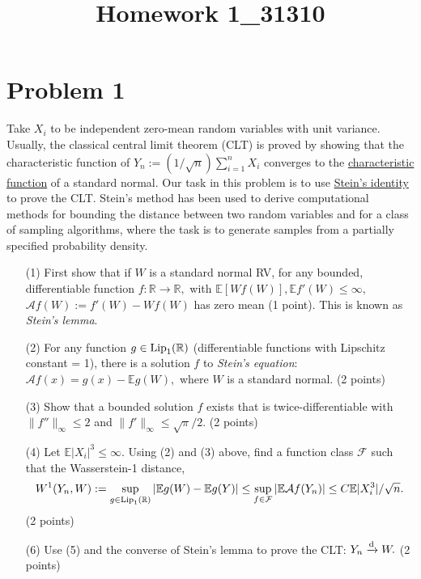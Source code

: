\documentclass[12pt]{article}
\title{Homework 1_31310}
\renewcommand{\E}{\mathbb{E}}
\begin{document}
\MakeScribeTop

\section*{Problem 1}
Take $X_i$ to be independent zero-mean random variables with unit variance.
Usually, the classical central limit theorem (CLT) is proved by showing that the characteristic 
function of $Y_n := (1/\sqrt{n}) \sum_{i=1}^n X_i$ converges to the \href{}{characteristic function} of a 
standard normal. 
Our task in this problem is to use \href{}{Stein's identity} to prove the CLT. Stein's method has been used 
to derive computational methods for bounding the distance between two random variables and for a class 
of sampling algorithms, where the task is to generate samples from a partially specified probability density.
\begin{itemize}
	\item[(1)] First show that if $W$ is a standard normal RV, for any bounded, differentiable function $f:\mathbb{R} \to \mathbb{{R}},$ with $\E [W f(W)], \E f'(W) \leq \infty,$
				$\mathcal{A}f (W) := f'(W) -  W f(W)$ has zero mean (1 point). This is known as \emph{Stein's lemma}.
	\item[(2)] For any function $g \in {\rm Lip}_1(\mathbb{R})$ (differentiable functions with Lipschitz constant = 1), there is a solution $f$ 
				 to \emph{Stein's equation}: $\mathcal{A} f (x) = g(x) - \E g(W),$ where $W$ is a standard normal. (2 points)
	\item[(3)] Show that a bounded solution $f$ exists that is twice-differentiable with $\|f''\|_\infty \leq 2$ and $\|f'\|_\infty \leq \sqrt{\pi}/2.$ (2 points)
	\item[(4)] Let $\E|X_i|^3 \leq \infty.$ Using (2) and (3) above, find a function class $\mathcal{F}$ such that the Wasserstein-1 distance,
	 $$ W^1(Y_n, W) := \sup_{g \in {\rm Lip}_1(\mathbb{R})} |\E g(W) - \E g(Y)| \leq \sup_{f \in \mathcal{F}} |\E\mathcal{A} f(Y_n)| \leq C \E|X_i^3|/\sqrt{n}. $$ (2 points)
	\item[(6)] Use (5) and the converse of Stein's lemma to prove the CLT: $Y_n \xrightarrow[]{\rm d} W.$ (2 points) 
\end{itemize}
\end{document}
